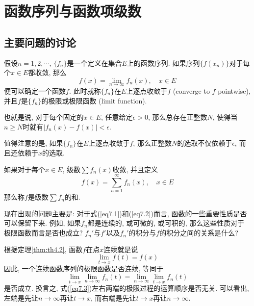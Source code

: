 \documentclass[cn,12pt,math=mtpro2,citestyle=gb7714-2015,bibstyle=gb7714-2015,twocol]{elegantbook}
\newcommand{\limn }{\lim_{n\to\infty}}
\begin{document}
\chapter{函数序列与函数项级数}
\section{主要问题的讨论}
\begin{definition}
假设$n=1,2,\cdots$, $\{f_n\}$是一个定义在集合$E$上的函数序列. 如果序列$\{f(x_n)\}$对于每个$x\in E$都收敛, 那么
\begin{equation}\label{eq7.1}
  f(x)=\limn f_n(x),\quad x\in E
\end{equation}
便可以确定一个函数$f$. 此时就称$\{f_n\}$在$E$上逐点收敛于$f$ (converge to $f$ pointwise), 并且$f$是$\{f_n\}$的极限或极限函数 (limit function).
\end{definition}

也就是说, 对于每个固定的$x\in E$, 任意给定$\epsilon>0$, 那么总存在正整数$N$, 使得当$n\geq N$时就有$|f_n(x)-f(x)|<\epsilon$.

值得注意的是, 如果$\{f_n\}$在$E$上逐点收敛于$f$, 那么正整数$N$的选取不仅依赖于$\epsilon$, 而且还依赖于$x$的选取.

\begin{definition}
如果对于每个$x\in E$, 级数$\sum f_n(x)$收敛, 并且定义
\begin{equation}\label{eq7.2}
  f(x)=\sum_{n=1}^{\infty}f_n(x),\quad x\in E
\end{equation}
那么称$f$是级数$\sum f_n$的和.
\end{definition}
现在出现的问题主要是: 对于式(\ref{eq7.1})和(\ref{eq7.2})而言, 函数的一些重要性质是否可以保留下来. 例如, 如果$f_n$都是连续的, 或可微的, 或可积的, 那么这些性质对于极限函数而言是否也成立? $f_n'$与$f'$以及$f_n'$的积分与$f$的积分之间的关系是什么?

根据定理\ref{thm:th4.2}, 函数$f$在点$x$连续就是说
$$\lim_{t\to x}f(t)=f(x)$$
因此, 一个连续函数序列的极限函数是否连续, 等同于
\begin{equation}\label{eq7.3}
  \lim_{t\to x}\limn f_n(t)=\limn \lim_{t\to x}f_n(t)
\end{equation}
是否成立. 换言之, 式(\ref{eq7.3})左右两端的极限过程的运算顺序是否无关. 可以看出, 左端是先让$n\to\infty$再让$t\to x$, 而右端是先让$t\to x$再让$n\to\infty$.
\end{document}

